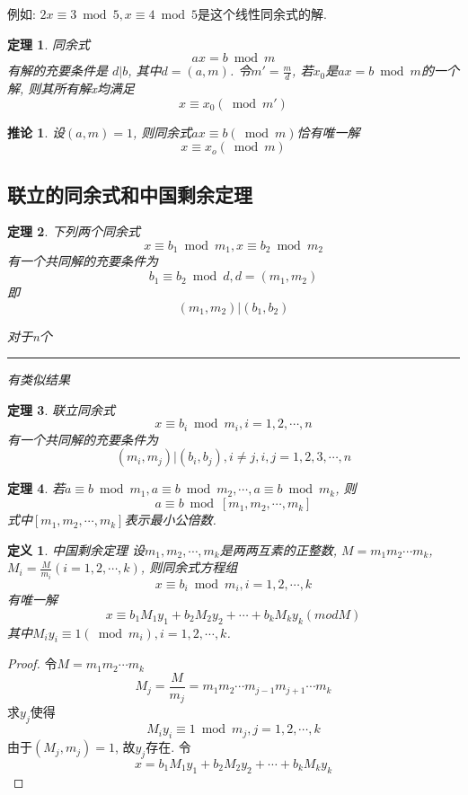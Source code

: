 \documentclass[UTF8]{ctexart}
\newcommand\hl{\bgroup\markoverwith
  {\textcolor{yellow}{\rule[-.5ex]{2pt}{2.5ex}}}\ULon}
\newtheorem{theorem}{\hspace{2em}定理}[section]
\newtheorem{definition}{\hspace{2em}定义}[section]
\newtheorem{corollary}{\hspace{2em}推论}[section]
\newtheorem{proof}{\hspace{2em}证明}[section]
\begin{document}
    例如: $2x\equiv 3\bmod 5, x\equiv 4\bmod 5$是这个线性同余式的解.

    \begin{theorem}
        同余式
        $$ax=b\bmod m$$
        有解的充要条件是 $d|b$, 其中$d=(a,m)$. 令$m'=\frac{m}{d}$, 若$x_0$是$ax=b\bmod m$的一个解, 则其所有解x均满足
        $$x\equiv x_0(\bmod m')$$
    \end{theorem}
    \begin{corollary}
        设$(a, m)=1$, 则同余式$ax\equiv b(\bmod m)$恰有唯一解
        $$x\equiv x_o(\bmod m)$$
    \end{corollary}

    \subsection{联立的同余式和中国剩余定理}
    \begin{theorem}
        下列两个同余式
        $$x\equiv b_1\bmod m_1, x\equiv b_2\bmod m_2$$
        有一个共同解的充要条件为
        $$b_1\equiv b_2\bmod d, d=(m_1, m_2)$$
        即$$(m_1, m_2)|(b_1, b_2)$$

        对于n个\hl{联立同余式}有类似结果
    \end{theorem}
    \begin{theorem}
        联立同余式
        $$x\equiv b_i\bmod m_i, i=1,2,\cdots, n$$
        有一个共同解的充要条件为
        $$(m_i, m_j)|(b_i, b_j), i\ne j, i, j=1,2,3,\cdots,n$$
    \end{theorem}
    \begin{theorem}
        若$a\equiv b\bmod m_1, a\equiv b\bmod m_2, \cdots, a\equiv b\bmod m_k$, 则
        $$a\equiv b\bmod [m_1, m_2, \cdots, m_k]$$
        式中$[m_1, m_2, \cdots, m_k]$表示最小公倍数.
    \end{theorem}
    \begin{definition}{中国剩余定理}
        设$m_1, m_2, \cdots, m_k$是两两互素的正整数, $M=m_1m_2\cdots m_k$, $M_i=\frac{M}{m_i}(i=1,2,\cdots,k)$,
        则同余式方程组
        $$x\equiv b_i\bmod m_i, i=1,2,\cdots, k$$
        有唯一解
        $$x\equiv b_1M_1y_1+b_2M_2y_2+\cdots+b_kM_ky_k(mod M)$$
        其中$M_iy_i\equiv 1(\bmod m_i), i=1,2,\cdots, k$.
    \end{definition}
    \begin{proof}
        令$M=m_1m_2\cdots m_k$
        $$M_j=\frac{M}{m_j}=m_1m_2\cdots m_{j-1}m_{j+1}\cdots m_k$$
        求$y_j$使得
        $$M_iy_i\equiv 1\bmod m_j, j=1,2,\cdots,k$$
        由于$(M_j, m_j)=1$, 故$y_j$存在. 令
        $$x=b_1M_1y_1+b_2M_2y_2+\cdots +b_kM_ky_k$$
    \end{proof}
\end{document}
